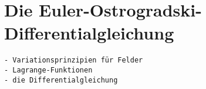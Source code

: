 %
%
%
\section{Die Euler-Ostrogradski-Differentialgleichung
\label{buch:felder:section:euler-ostrogradski}}

\begin{verbatim}
- Variationsprinzipien für Felder
- Lagrange-Funktionen
- die Differentialgleichung
\end{verbatim}
